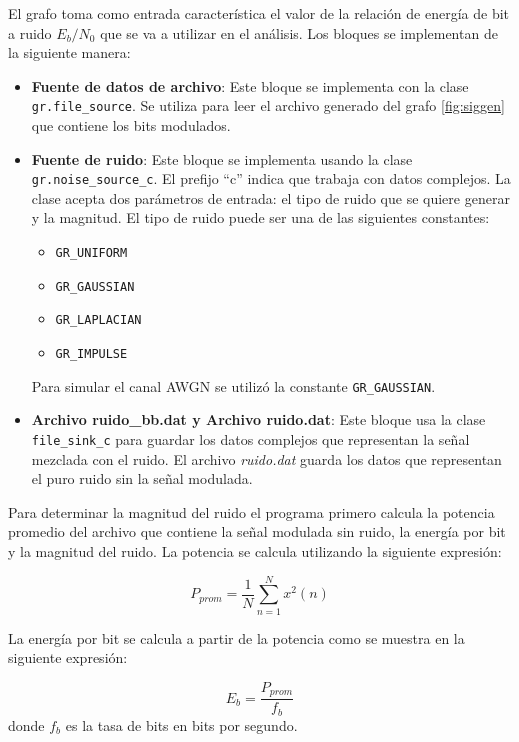 El grafo toma como entrada caracter\'istica el valor de la relaci\'on de energ\'ia de bit a ruido
$E_b/N_0$ que se va a utilizar en el an\'alisis. Los bloques se implementan de la siguiente manera:

\begin{itemize}
  \item \textbf{Fuente de datos de archivo}: Este bloque se implementa con la clase
  \verb|gr.file_source|. Se utiliza para leer el archivo generado del grafo \ref{fig:siggen} que
  contiene los bits modulados.
  \item \textbf{Fuente de ruido}: Este bloque se implementa usando la clase \\
  \verb|gr.noise_source_c|. El prefijo ``c'' indica que trabaja con datos complejos. La clase acepta
  dos par\'ametros de entrada: el tipo de ruido que se quiere generar y la magnitud. El tipo de
  ruido puede ser una de las siguientes constantes:
  \begin{itemize}
    \item \verb|GR_UNIFORM|
    \item \verb|GR_GAUSSIAN|
    \item \verb|GR_LAPLACIAN|
    \item \verb|GR_IMPULSE| 
  \end{itemize}
  Para simular el canal AWGN se utiliz\'o la constante \verb|GR_GAUSSIAN|.
  \item \textbf{Archivo ruido\_bb.dat y Archivo ruido.dat}: Este bloque usa la clase
  \verb|file_sink_c| para guardar los datos complejos que representan la se\~nal mezclada con el
  ruido. El archivo \emph{ruido.dat} guarda los datos que representan el puro ruido sin la se\~nal
  modulada.
\end{itemize}

Para determinar la magnitud del ruido el programa primero calcula la potencia promedio del archivo
que contiene la se\~nal modulada sin ruido, la energ\'ia por bit y la magnitud del ruido. La potencia se calcula utilizando la
siguiente expresi\'on:

\begin{equation}\label{eq:bitpower}
P_{prom}=\frac{1}{N}\sum_{n=1}^{N}{x^2(n)}
\end{equation}

La energ\'ia por bit se calcula a partir de la potencia como se muestra en la siguiente
expresi\'on:

\begin{equation}\label{eq:bitenergy}
E_b=\frac{P_{prom}}{f_b}
\end{equation}
donde $f_b$ es la tasa de bits en bits por segundo.

